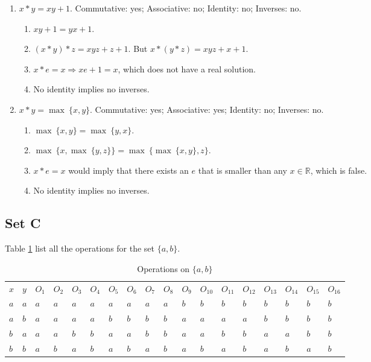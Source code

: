 \documentclass{article}
\begin{document}
\begin{enumerate}
\item $x * y = xy + 1$. Commutative: yes; Associative: no; Identity: no; Inverses: no.
\begin{enumerate}[label=(\roman*)]
    \item $xy + 1 = yx + 1$.
    \item $(x * y) * z = xyz + z + 1$. But $x * (y * z) = xyz + x + 1$.
    \item $x * e = x \Rightarrow xe + 1 = x$, which does not have a real solution.
    \item No identity implies no inverses.
\end{enumerate}

\item $x * y = \max\ \{x, y\}$. Commutative: yes; Associative: yes; Identity: no; Inverses: no.
\begin{enumerate}[label=(\roman*)]
    \item $\max\ \{x, y\} = \max\ \{y, x\}$.
    \item $\max\ \{x, \max\ \{y, z\}\} = \max\ \{\max\ \{x, y\}, z\}$.
    \item $x * e = x$ would imply that there exists an $e$ that is smaller than any $x \in \mathbb{R}$, which is false.
    \item No identity implies no inverses.
\end{enumerate}
\end{enumerate}

\subsection*{Set C}
Table \ref{tab:binary-operations} list all the operations for the set $\{a, b\}$. 

\begin{table}[]
    \centering
    \caption{Operations on $\{a, b\}$}
    \label{tab:binary-operations}
    \begin{tabular}{ll|llllllllllllllll}
    $x$ & $y$ & $O_1$ & $O_2$ & $O_3$ & $O_4$ & $O_5$ & $O_6$ & $O_7$ & $O_8$ & $O_9$ & $O_{10}$ & $O_{11}$ & $O_{12}$ & $O_{13}$ & $O_{14}$ & $O_{15}$ & $O_{16}$ \\
    $a$ & $a$ & $a$     & $a$     & $a$     & $a$     & $a$     & $a$     & $a$     & $a$     & $b$     & $b$      & $b$      & $b$      & $b$      & $b$      & $b$      & $b$      \\
    $a$ & $b$ & $a$     & $a$     & $a$     & $a$     & $b$     & $b$     & $b$     & $b$     & $a$     & $a$      & $a$      & $a$      & $b$      & $b$      & $b$      & $b$      \\
    $b$ & $a$ & $a$     & $a$     & $b$     & $b$     & $a$     & $a$     & $b$     & $b$     & $a$     & $a$      & $b$      & $b$      & $a$      & $a$      & $b$      & $b$      \\
    $b$ & $b$ & $a$     & $b$     & $a$     & $b$     & $a$     & $b$     & $a$     & $b$     & $a$     & $b$      & $a$      & $b$      & $a$      & $b$      & $a$      & $b$     
    \end{tabular}
\end{table}
\end{document}
